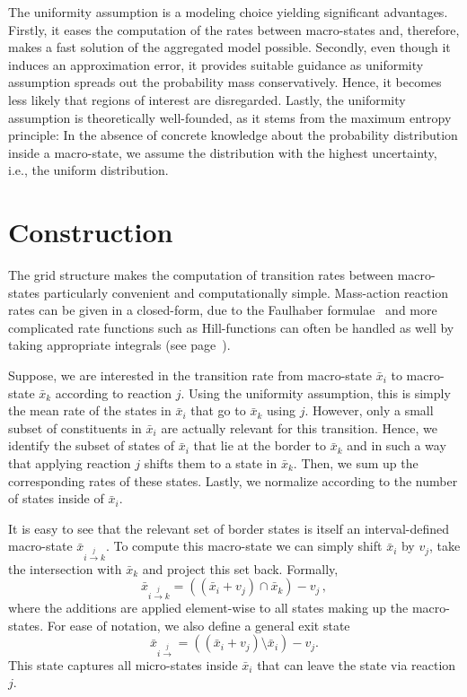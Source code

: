 The uniformity assumption is a modeling choice yielding significant advantages.
Firstly, it eases the computation of the rates between macro-states and, therefore, makes a fast solution of the aggregated model possible.
Secondly, even though it induces an approximation error, it provides suitable guidance as uniformity assumption spreads out the probability mass conservatively.
Hence, it becomes less likely that regions of interest are disregarded.
Lastly, the uniformity assumption is theoretically well-founded, as it stems from the maximum entropy principle: 
In the absence of concrete knowledge about the probability distribution inside a macro-state, we assume the distribution with the highest uncertainty, i.e., the uniform distribution. 

\section{Construction}
The grid structure makes the computation of transition rates between macro-states particularly convenient and computationally simple.
Mass-action reaction rates can be given in a closed-form,
due to the Faulhaber formulae~\parencite{knuth1993johann} and more complicated rate functions such as Hill-functions can often be handled as well by taking appropriate integrals (see page~\pageref{model:hill_toggle}).

Suppose, we are interested in the transition rate from macro-state $\bar{x}_i$ to macro-state $\bar{x}_k$ according to reaction $j$.
Using the uniformity assumption, this is simply the mean rate of the states in $\bar{x}_i$ that go to $\bar{x}_k$ using $j$.
However, only a small subset of constituents in $\bar{x}_i$ are actually relevant for this transition.
Hence, we identify the subset of states of $\bar{x}_i$ that lie at the border to $\bar{x}_k$ and in such a way that applying reaction $j$ shifts them to a state in $\bar{x}_k$. Then, we sum up the corresponding rates of these states. Lastly, we normalize according to the number of states inside of $\bar{x}_i$.

It is easy to see that the relevant set of border states is itself an
interval-defined macro-state $\bar{x}_{i\xrightarrow{j}k}$.
To compute this macro-state
we can simply shift $\bar{x}_i$ by $v_j$, take the intersection
with $\bar{x}_k$ and project this set back.
Formally,
\begin{equation}\label{eq:transition_set}
    \bar{x}_{i\xrightarrow{j}k} = ((\bar{x}_i + v_j) \cap \bar{x}_k) - v_j\,,
\end{equation}
where the additions are applied element-wise to all states
making up the macro-states.
For ease of notation, we also define a general exit state
\begin{equation}\label{eq:outgoing_set}
    \bar{x}_{i\xrightarrow{j}} = ((\bar{x}_i + v_j) \setminus \bar{x}_i) - v_j.
\end{equation}
This state captures all micro-states inside $\bar{x}_i$ that can leave the state via reaction $j$.

